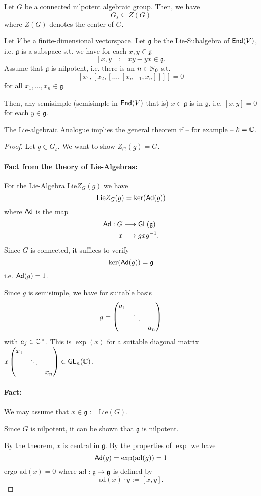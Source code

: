 \begin{theorem}
	Let $G$ be a connected nilpotent algebraic group. Then, we have
	\[ G_s \subseteq Z(G) \]
	where $Z(G)$ denotes the center of $G$.
\end{theorem}
\begin{theorem}
Let $V$ be a finite-dimensional vectorspace. Let $\mathfrak{g}$ be the Lie-Subalgebra of $\textsf{End}(V)$, i.e. $\mathfrak{g}$ is a subspace s.t. we have for each $x,y \in \mathfrak{g}$
\[ [x,y] := xy - yx \in \mathfrak{g}. \]
Assume that $\mathfrak{g}$ is nilpotent, i.e. there is an $n \in \mathbb{N}_0$ s.t.
\[ [x_1, [x_2, [\ldots, [x_{n-1}, x_n]]]] = 0 \]
for all $x_1, \ldots, x_n \in \mathfrak{g}$.

Then, any semisimple (semisimple in $\textsf{End}(V)$ that is) $x \in \mathfrak{g}$ is  in $\mathfrak{g}$, i.e. $[x,y] = 0$ for each $y \in \mathfrak{g}$.
\end{theorem}
\begin{remark}
	The Lie-algebraic Analogue implies the general theorem if -- for example -- $k = \mathbb{C}$.
\end{remark}
\begin{proof}
Let $g \in G_s$. We want to show $Z_G(g) = G$.

\newcommand{\Lie}{\mathrm{Lie}}
\paragraph{Fact from the theory of Lie-Algebras:}
For the Lie-Algebra $\Lie Z_G(g)$ we have
\[ \Lie Z_G(g) = \ker (\Ad(g)) \]
where $\textsf{Ad}$ is the map
\begin{align*}
\textsf{Ad} : G & \overset{}{\longrightarrow} \textsf{GL}(\mathfrak{g})\\
x & \longmapsto gxg^{-1}.
\end{align*}
Since $G$ is connected, it suffices to verify
\[ \ker (\textsf{Ad} (g)) = \mathfrak{g} \]
i.e. $\textsf{Ad}(g) = 1$.

Since $g$ is semisimple, we have for suitable basis
\[ g = \left(\begin{matrix} a_1 \\ & \ddots \\ & & a_n \end{matrix}\right) \]
with $a_j \in \mathbb{C}^\times$. This is $\exp(x)$ for a suitable diagonal matrix $x \left(\begin{matrix} x_1 \\ & \ddots \\ & & x_n \end{matrix}\right) \in \textsf{GL}_n(\mathbb{C})$.
\paragraph{Fact:}
We may assume that $x \in \mathfrak{g} := \Lie (G)$.

Since $G$ is nilpotent, it can be shown that $\mathfrak{g}$ is nilpotent.

By the theorem, $x$ is central in $\mathfrak{g}$. By the properties of $\exp$ we have
\[ \textsf{Ad}(g) = \exp(\mathrm{ad}(g)) = 1 \]
ergo $\mathrm{ad}(x) = 0$ where $\mathrm{ad}: \mathfrak{g} \overset{}{\rightarrow} \mathfrak{g}$ is defined by 
\[ \mathrm{ad}(x) \cdot y := [x,y]. \]
\end{proof}

